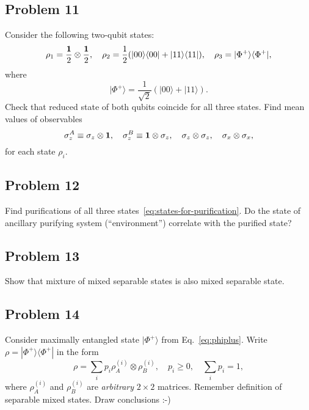 \documentclass[a4paper,10pt]{article}
\newcommand{\ket}[1]{|#1\rangle}
\newcommand{\bra}[1]{\langle#1|}
\begin{document}
\subsection*{Problem 11}
Consider the following two-qubit states:
\begin{equation} \label{eq:states-for-purification}
	\rho_1= \frac{{\bf 1}}{2}\otimes \frac{{\bf 1}}{2}, \quad \rho_{2}=\frac{1}{2}(\ket{00}\bra{00}+\ket{11}\bra{11}), \quad \rho_{3}=\ket{\Phi^{+}}\bra{\Phi^{+}},
\end{equation}
where
\begin{equation} \label{eq:phiplus}
	\ket{\Phi^{+}}=\frac{1}{\sqrt{2}}(\ket{00}+\ket{11}).
\end{equation}
Check that reduced state of both qubits coincide for all three states.
Find mean values of observables
\begin{equation}
	\sigma_{z}^{A}\equiv \sigma_{z}\otimes {\bf 1}, \quad \sigma_{z}^{B}\equiv {\bf 1}\otimes  \sigma_{z}, \quad \sigma_{z}\otimes\sigma_{z}, \quad \sigma_{x}\otimes\sigma_{x},
\end{equation}
for each state $\rho_{i}$.


\subsection*{Problem 12}
Find purifications of all three states~\eqref{eq:states-for-purification}.
Do the state of ancillary purifying system (``environment'') correlate with the purified state?


\subsection*{Problem 13}
Show that mixture of mixed separable states is also mixed separable state.


\subsection*{Problem 14}
Consider maximally entangled state $\ket{\Phi^{+}}$ from Eq.~\eqref{eq:phiplus}.
Write $\rho=\ket{\Phi^{+}}\bra{\Phi^{+}}$ in the form
\begin{equation}
	\rho = \sum_{i} p_{i} \rho_{A}^{(i)} \otimes \rho_{B}^{(i)}, \quad p_{i}\geq 0, \quad \sum_{i}p_{i}=1,
\end{equation}
where $\rho_{A}^{(i)}$ and $\rho_{B}^{(i)}$ are \emph{arbitrary} $2\times2$ matrices.
Remember definition of separable mixed states. 
Draw conclusions :-)
\end{document}
